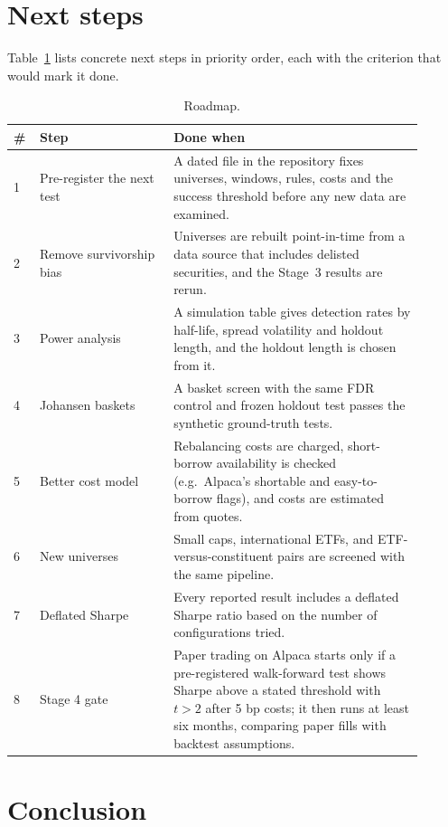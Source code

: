 \documentclass[11pt]{article}
\begin{document}
\section{Next steps}

Table~\ref{tab:next} lists concrete next steps in priority order, each with the criterion that
would mark it done.

\begin{table}[ht]
\centering
\caption{Roadmap.}
\label{tab:next}
\small
\begin{tabular}{p{0.04\linewidth}p{0.30\linewidth}p{0.56\linewidth}}
\toprule
\# & Step & Done when\\
\midrule
1 & Pre-register the next test & A dated file in the repository fixes universes, windows,
    rules, costs and the success threshold before any new data are examined.\\
2 & Remove survivorship bias & Universes are rebuilt point-in-time from a data source that
    includes delisted securities, and the Stage~3 results are rerun.\\
3 & Power analysis & A simulation table gives detection rates by half-life, spread
    volatility and holdout length, and the holdout length is chosen from it.\\
4 & Johansen baskets & A basket screen with the same FDR control and frozen holdout test
    passes the synthetic ground-truth tests.\\
5 & Better cost model & Rebalancing costs are charged, short-borrow availability is checked
    (e.g.\ Alpaca's shortable and easy-to-borrow flags), and costs are estimated from quotes.\\
6 & New universes & Small caps, international ETFs, and ETF-versus-constituent pairs are
    screened with the same pipeline.\\
7 & Deflated Sharpe & Every reported result includes a deflated Sharpe ratio based on the
    number of configurations tried.\\
8 & Stage 4 gate & Paper trading on Alpaca starts only if a pre-registered walk-forward test
    shows Sharpe above a stated threshold with $t>2$ after 5 bp costs; it then runs at least
    six months, comparing paper fills with backtest assumptions.\\
\bottomrule
\end{tabular}
\end{table}

\section{Conclusion}
\end{document}
